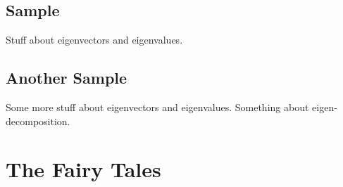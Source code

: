 \documentclass[oneside,11pt]{book} %
\theoremstyle{definition}
\theoremstyle{remark}
\begin{document}
    \chapter{Sample}
    Stuff about eigenvectors and
    eigenvalues.

    \chapter{Another Sample}

    Some more stuff about eigenvectors and
    eigenvalues. Something about
    eigen-decomposition.


    \part{The Fairy Tales}
    
    
    

    \backmatter

    \nocite{*}      %
\end{document}
